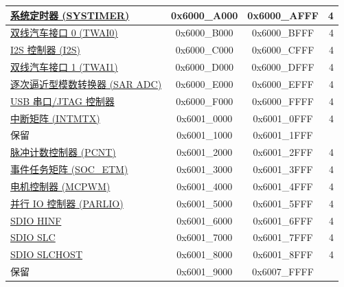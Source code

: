 \begin{ThreePartTable}
\begin{longtable}[c]{ |p{7cm}|c|c|r| }
\hyperref[mod:systimer]{系统定时器 (SYSTIMER)}                    & 0x6000\_A000 & 0x6000\_AFFF &   4        \\\hline
\hyperref[mod:twai]{双线汽车接口 0 (TWAI0)}                      & 0x6000\_B000 & 0x6000\_BFFF &   4        \\\hline
\hyperref[mod:i2s]{I2S 控制器 (I2S)}            & 0x6000\_C000 & 0x6000\_CFFF &   4     \\\hline
\hyperref[mod:twai]{双线汽车接口 1 (TWAI1)}                      & 0x6000\_D000 & 0x6000\_DFFF &   4        \\\hline
\hyperref[mod:sensor]{逐次逼近型模数转换器 (SAR ADC)}              & 0x6000\_E000 & 0x6000\_EFFF &   4        \\\hline
\hyperref[mod:usbserialjtag]{USB 串口/JTAG 控制器}                  & 0x6000\_F000 & 0x6000\_FFFF &   4     \\\hline

\hyperref[mod:intmtrx]{中断矩阵 (INTMTX)}            & 0x6001\_0000 & 0x6001\_0FFF &   4     \\\hline
    \rowcolor{gray!25}  保留                    & 0x6001\_1000 & 0x6001\_1FFF &        \\\hline
\hyperref[mod:pcnt]{脉冲计数控制器 (PCNT)}& 0x6001\_2000 & 0x6001\_2FFF &   4        \\\hline
\hyperref[mod:evntaskmatrix]{事件任务矩阵 (SOC\_ETM)} & 0x6001\_3000 & 0x6001\_3FFF &   4     \\\hline
\hyperref[mod:mcpwm]{电机控制器 (MCPWM)} & 0x6001\_4000 & 0x6001\_4FFF &   4     \\\hline
\hyperref[mod:parlio]{并行 IO 控制器 (PARLIO) }                    & 0x6001\_5000 & 0x6001\_5FFF &   4        \\\hline
\hyperref[mod:sdioslave]{SDIO HINF}\tnote{\textcolor{red}{*}}& 0x6001\_6000 & 0x6001\_6FFF &   4     \\\hline
\hyperref[mod:sdioslave]{SDIO SLC}\tnote{\textcolor{red}{*}} & 0x6001\_7000 & 0x6001\_7FFF &   4  \\\hline
\hyperref[mod:sdioslave]{SDIO SLCHOST}\tnote{\textcolor{red}{*}}                   & 0x6001\_8000 & 0x6001\_8FFF &   4 \\\hline
    \rowcolor{gray!25}  保留                    & 0x6001\_9000 & 0x6007\_FFFF &        \\\hline


\end{longtable}
\end{ThreePartTable}
